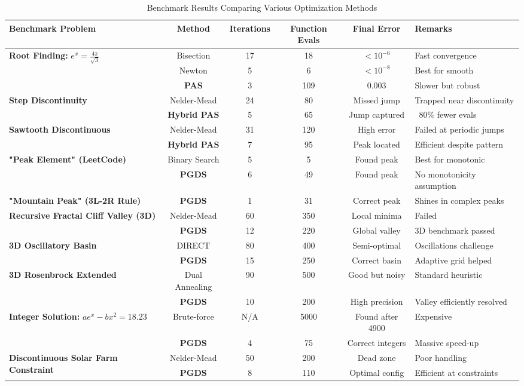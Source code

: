 \documentclass[10pt,twocolumn,letterpaper]{article}
\begin{document}
\begin{table*}[t]
\caption{Benchmark Results Comparing Various Optimization Methods}
\label{tab:benchmark-results}
\centering
\begin{tabular}{@{}lccccl@{}}
\toprule
\textbf{Benchmark Problem} & \textbf{Method} & \textbf{Iterations} & \textbf{Function Evals} & \textbf{Final Error} & \textbf{Remarks} \\
\midrule
\multirow{3}{*}{\textbf{Root Finding:} $e^x = \frac{4\pi}{\sqrt{3}}$} & Bisection & 17 & 18 & $< 10^{-6}$ & Fast convergence \\
& Newton & 5 & 6 & $< 10^{-8}$ & Best for smooth \\
& \textbf{PAS} & 3 & 109 & 0.003 & Slower but robust \\
\midrule
\multirow{2}{*}{\textbf{Step Discontinuity}} & Nelder-Mead & 24 & 80 & Missed jump & Trapped near discontinuity \\
& \textbf{Hybrid PAS} & 5 & 65 & Jump captured & ~80\% fewer evals \\
\midrule
\multirow{2}{*}{\textbf{Sawtooth Discontinuous}} & Nelder-Mead & 31 & 120 & High error & Failed at periodic jumps \\
& \textbf{Hybrid PAS} & 7 & 95 & Peak located & Efficient despite pattern \\
\midrule
\multirow{2}{*}{\textbf{"Peak Element" (LeetCode)}} & Binary Search & 5 & 5 & Found peak & Best for monotonic \\
& \textbf{PGDS} & 6 & 49 & Found peak & No monotonicity assumption \\
\midrule
\textbf{"Mountain Peak" (3L-2R Rule)} & \textbf{PGDS} & 1 & 31 & Correct peak & Shines in complex peaks \\
\midrule
\multirow{2}{*}{\textbf{Recursive Fractal Cliff Valley (3D)}} & Nelder-Mead & 60 & 350 & Local minima & Failed \\
& \textbf{PGDS} & 12 & 220 & Global valley & 3D benchmark passed \\
\midrule
\multirow{2}{*}{\textbf{3D Oscillatory Basin}} & DIRECT & 80 & 400 & Semi-optimal & Oscillations challenge \\
& \textbf{PGDS} & 15 & 250 & Correct basin & Adaptive grid helped \\
\midrule
\multirow{2}{*}{\textbf{3D Rosenbrock Extended}} & Dual Annealing & 90 & 500 & Good but noisy & Standard heuristic \\
& \textbf{PGDS} & 10 & 200 & High precision & Valley efficiently resolved \\
\midrule
\multirow{2}{*}{\textbf{Integer Solution:} $ae^x - bx^2 = 18.23$} & Brute-force & N/A & 5000 & Found after 4900 & Expensive \\
& \textbf{PGDS} & 4 & 75 & Correct integers & Massive speed-up \\
\midrule
\multirow{2}{*}{\textbf{Discontinuous Solar Farm Constraint}} & Nelder-Mead & 50 & 200 & Dead zone & Poor handling \\
& \textbf{PGDS} & 8 & 110 & Optimal config & Efficient at constraints \\
\bottomrule
\end{tabular}
\end{table*}
\end{document}
